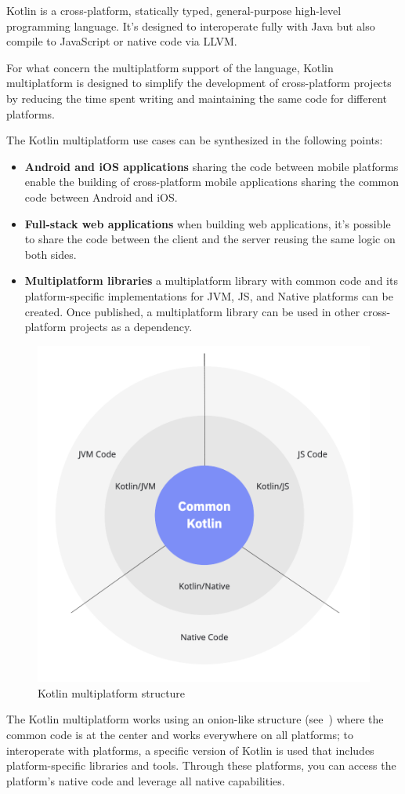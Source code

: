 Kotlin is a cross-platform, statically typed, general-purpose high-level programming language.
It's designed to interoperate fully with Java but also compile to JavaScript or native code via LLVM.

For what concern the multiplatform support of the language, Kotlin multiplatform is designed to simplify the development of cross-platform projects
by reducing the time spent writing and maintaining the same code for different platforms.

The Kotlin multiplatform use cases can be synthesized in the following points:
\begin{itemize}
	\item \textbf{Android and iOS applications} sharing the code between mobile platforms enable the building of cross-platform mobile applications
	      sharing the common code between Android and iOS.
	\item \textbf{Full-stack web applications} when building web applications, it's possible to share the code between the client and the server
	      reusing the same logic on both sides.
	\item \textbf{Multiplatform libraries} a multiplatform library with common code and its platform-specific implementations for JVM, JS, and Native platforms can be created. Once published, a multiplatform library can be used in other cross-platform projects as a dependency.
\end{itemize}

\begin{figure}
	\centering
	\includegraphics[width=.5\linewidth]{figures/kotlin-multiplatform.png}
	\caption{Kotlin multiplatform structure}
	\label{fig:kotlin-multiplatform-structure}
\end{figure}

The Kotlin multiplatform works using an onion-like structure (see~) where the common code is at the center
and works everywhere on all platforms; to interoperate with platforms, a specific version of Kotlin is used that includes platform-specific
libraries and tools. Through these platforms, you can access the platform's native code and leverage all native capabilities.

